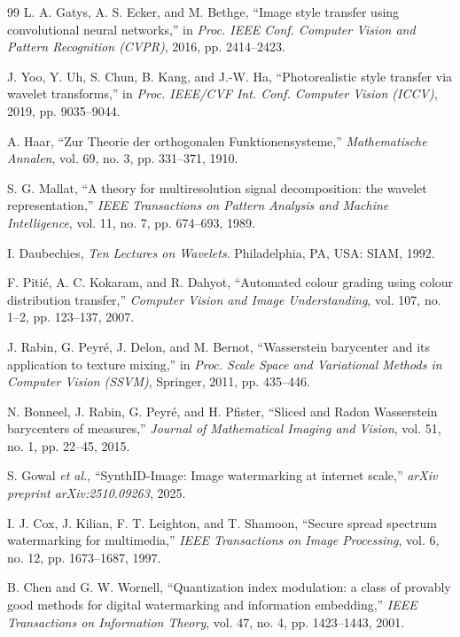 \documentclass[conference,10pt]{IEEEtran}
\begin{document}
\begin{thebibliography}{99}
L. A. Gatys, A. S. Ecker, and M. Bethge, ``Image style transfer using convolutional neural networks,'' in \emph{Proc. IEEE Conf. Computer Vision and Pattern Recognition (CVPR)}, 2016, pp. 2414--2423.

J. Yoo, Y. Uh, S. Chun, B. Kang, and J.-W. Ha, ``Photorealistic style transfer via wavelet transforms,'' in \emph{Proc. IEEE/CVF Int. Conf. Computer Vision (ICCV)}, 2019, pp. 9035--9044.

A. Haar, ``Zur Theorie der orthogonalen Funktionensysteme,'' \emph{Mathematische Annalen}, vol. 69, no. 3, pp. 331--371, 1910.

S. G. Mallat, ``A theory for multiresolution signal decomposition: the wavelet representation,'' \emph{IEEE Transactions on Pattern Analysis and Machine Intelligence}, vol. 11, no. 7, pp. 674--693, 1989.

I. Daubechies, \emph{Ten Lectures on Wavelets}. Philadelphia, PA, USA: SIAM, 1992.

F. Piti\'{e}, A. C. Kokaram, and R. Dahyot, ``Automated colour grading using colour distribution transfer,'' \emph{Computer Vision and Image Understanding}, vol. 107, no. 1--2, pp. 123--137, 2007.

J. Rabin, G. Peyr\'{e}, J. Delon, and M. Bernot, ``Wasserstein barycenter and its application to texture mixing,'' in \emph{Proc. Scale Space and Variational Methods in Computer Vision (SSVM)}, Springer, 2011, pp. 435--446.

N. Bonneel, J. Rabin, G. Peyr\'{e}, and H. Pfister, ``Sliced and Radon Wasserstein barycenters of measures,'' \emph{Journal of Mathematical Imaging and Vision}, vol. 51, no. 1, pp. 22--45, 2015.

S. Gowal \emph{et al.}, ``SynthID-Image: Image watermarking at internet scale,'' \emph{arXiv preprint arXiv:2510.09263}, 2025.

I. J. Cox, J. Kilian, F. T. Leighton, and T. Shamoon, ``Secure spread spectrum watermarking for multimedia,'' \emph{IEEE Transactions on Image Processing}, vol. 6, no. 12, pp. 1673--1687, 1997.

B. Chen and G. W. Wornell, ``Quantization index modulation: a class of provably good methods for digital watermarking and information embedding,'' \emph{IEEE Transactions on Information Theory}, vol. 47, no. 4, pp. 1423--1443, 2001.


\end{thebibliography}
\end{document}
